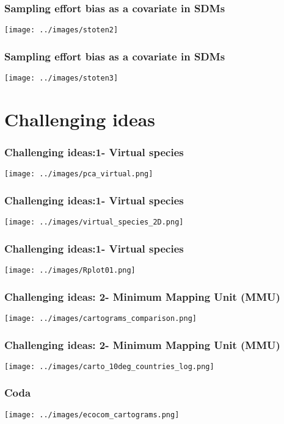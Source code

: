 \documentclass{beamer}
\begin{document}
\begin{frame}
\frametitle{Sampling effort bias as a covariate in SDMs}
\centering
\texttt{[image: ../images/stoten2]}\\
\end{frame}

\begin{frame}
\frametitle{Sampling effort bias as a covariate in SDMs}
\centering
\texttt{[image: ../images/stoten3]}\\
\end{frame}

\section{Challenging ideas}

\begin{frame}
\frametitle{Challenging ideas:1- Virtual species}
\centering
\texttt{[image: ../images/pca\_virtual.png]}\\
\end{frame}

\begin{frame}
\frametitle{Challenging ideas:1- Virtual species}
\centering
\texttt{[image: ../images/virtual\_species\_2D.png]}\\
\end{frame}

\begin{frame}
\frametitle{Challenging ideas:1- Virtual species}
\centering
\texttt{[image: ../images/Rplot01.png]}\\
\end{frame}

\begin{frame}
\frametitle{Challenging ideas: 2- Minimum Mapping Unit (MMU)}
\centering
\texttt{[image: ../images/cartograms\_comparison.png]}\\
\end{frame}

\begin{frame}
\frametitle{Challenging ideas: 2- Minimum Mapping Unit (MMU)}
\centering
\texttt{[image: ../images/carto\_10deg\_countries\_log.png]}\\
\end{frame}

\begin{frame}
\frametitle{Coda}
\centering
\texttt{[image: ../images/ecocom\_cartograms.png]}\\
\end{frame}
\end{document}
